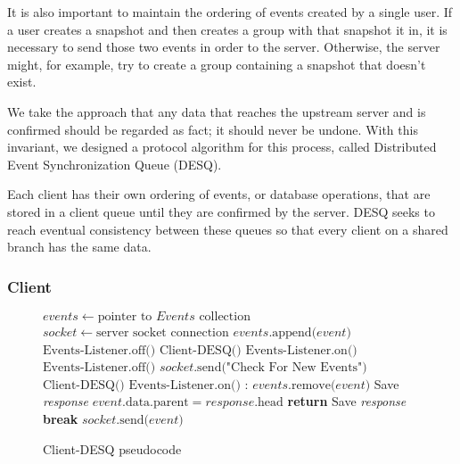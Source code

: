 It is also important to maintain the ordering of events created by a single user. If a user creates a snapshot and then creates a group with that snapshot it in, it is necessary to send those two events in order to the server. Otherwise, the server might, for example, try to create a group containing a snapshot that doesn't exist.

We take the approach that any data that reaches the upstream server and is confirmed should be regarded as fact; it should never be undone. With this invariant, we designed a protocol algorithm for this process, called Distributed Event Synchronization Queue (DESQ).

Each client has their own ordering of events, or database operations, that are stored in a client queue until they are confirmed by the server. DESQ seeks to reach eventual consistency between these queues so that every client on a shared branch has the same data.

\subsubsection{Client}

\begin{center}
\begin{figure}[ht]
\begin{algorithmic}[1]
\State $events \gets \text{pointer to }Events \text{ collection}$
\State $socket \gets \text{server socket connection}$
\State $events\text{.append(}event\text{)}$
\EndWhile
\EndFunction
{}
\State $\text{Events-Listener.off()}$
\State $\text{Client-DESQ()}$
\State $\text{Events-Listener.on()}$
\EndWhile
\EndFunction
{}
\State $\text{Events-Listener.off()}$
\State $socket\text{.send("Check For New Events")}$
\State $\text{Client-DESQ()}$
\State $\text{Events-Listener.on()}$
\EndWhile
\EndFunction
{}
:
\State $events\text{.remove(}event\text{)}$
 
\State Save \emph{response} 
\State $event\text{.data.parent} = response\text{.head}$
\EndIf
\Else {}
\State \textbf{return}
\EndIf
\State Save \emph{response}
\EndIf
\EndWhile
\EndFunction
{}
\State \textbf{break}
\EndIf
\State $socket\text{.send(}event\text{)}$
\EndFor
\EndProcedure
\end{algorithmic}
\caption{Client-DESQ pseudocode}\label{euclid}
\end{figure}
\end{center}

